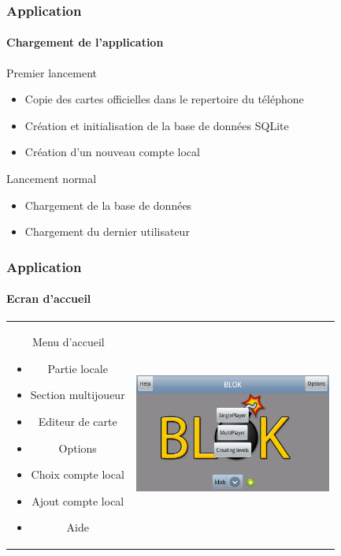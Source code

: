 	\begin{frame}
	\frametitle{Application}
	\framesubtitle{Chargement de l'application}
		\begin{block}{Premier lancement}
			\begin{itemize}
			 	\item Copie des cartes officielles dans le repertoire du téléphone 
				\item Création et initialisation de la base de données SQLite
				\item Création d'un nouveau compte local
			\end{itemize}
		\end{block}
				
		\begin{block}{Lancement normal}
			\begin{itemize}
				\item Chargement de la base de données 
				\item Chargement du dernier utilisateur
			\end{itemize}
		\end{block}
	
	\end{frame}
	
	
	\begin{frame}
	\frametitle{Application}
	\framesubtitle{Ecran d'accueil}
		\begin{center}
		\begin{tabular}{cc}
			\begin{minipage}{4cm}
		
				Menu d'accueil
				\begin{itemize}
					\item Partie locale
					\item Section multijoueur
					\item Editeur de carte
					\item Options
					\item Choix compte local
					\item Ajout compte local
					\item Aide
				\end{itemize}
			\end{minipage}  &		
			\begin{minipage}{8cm}
				\includegraphics[width=6.5cm]{img/2.png} 
			\end{minipage}\\
		\end{tabular}
		\end{center}
	
	\end{frame}
	
